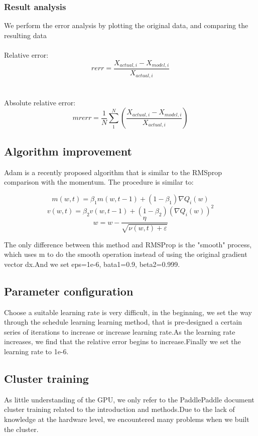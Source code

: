 \documentclass[conference,compsoc]{appendix/report}
\begin{document}
\subsubsection{Result analysis}
We perform the error analysis by plotting the original data, and comparing the resulting data
\\
\\
Relative error:
$$ rerr = \frac{{X}_{actual, i} - {X}_{model, i}}{{X}_{actual, i}} $$
\\
\\
Absolute relative error:
$$ mrerr = \frac{1}{N} \sum_{1}^{N}\left ( \frac{{X}_{actual, i} - {X}_{model, i}}{{X}_{actual, i}} \right ) $$


\subsection{Algorithm improvement}
Adam is a recently proposed algorithm that is similar to the RMSprop comparison with the momentum. The procedure is similar to:


$$m(w,t) = {\beta}_{1} m(w, t - 1) + (1 - {\beta}_{1})\nabla{Q}_{i}(w)$$
$$v(w,t) = {\beta}_{2} v(w, t - 1) + (1 - {\beta}_{2})(\nabla{Q}_{i}(w))^{2}$$
$$w  = w - \frac{\eta }{\sqrt{\nu (w, t) + \varepsilon }}$$

The only difference between this method and RMSProp is the "smooth" process, which uses m to do the smooth operation instead of using the original gradient vector dx.And we set eps=1e-6, bata1=0.9, beta2=0.999.


\subsection{Parameter configuration}
Choose a suitable learning rate is very difficult, in the beginning, we set the way through the schedule learning learning method, that is pre-designed a certain series of iterations to increase or increase learning rate.As the learning rate increases, we find that the relative error begins to increase.Finally we set the learning rate to 1e-6.

\subsection{Cluster training}
As little understanding of the GPU, we only refer to the PaddlePaddle document cluster training related to the introduction and methods.Due to the lack of knowledge at the hardware level, we encountered many problems when we built the cluster.
\end{document}

